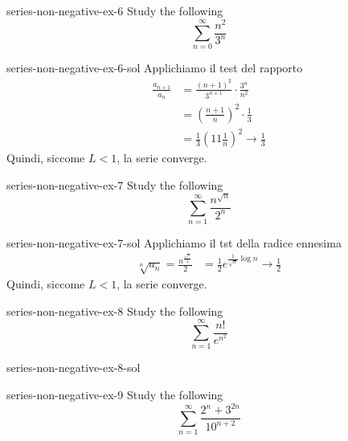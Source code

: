 \documentclass[preview]{standalone}
\begin{document}
\begin{snippetexercise}{series-non-negative-ex-6}{}
    Study the following \series
    \[
        \sum_{n=0}^\infty \frac{n^2}{3^n}
    \]
\end{snippetexercise}

\begin{snippetsolution}{series-non-negative-ex-6-sol}{}
    Applichiamo il test del rapporto
    \begin{align*}
        \frac{a_{n+1}}{a_n} &= \frac{{(n+1)}^2}{3^{n+1}}
        \cdot \frac{3^n}{n^2} \\
        &= {\left(\frac{n+1}{n}\right)}^2 \cdot \frac{1}{3}
        \\
        &= \frac{1}{3} {\left(1 1 \frac{1}{n}\right)}^2 \to \frac{1}{3}
    \end{align*}
    Quindi, siccome \(L < 1\), la serie converge.
\end{snippetsolution}

\begin{snippetexercise}{series-non-negative-ex-7}{}
    Study the following \series
    \[
        \sum_{n=1}^\infty \frac{n^{\sqrt{n}}}{2^n}
    \]
\end{snippetexercise}

\begin{snippetsolution}{series-non-negative-ex-7-sol}{}
    Applichiamo il tst della radice ennesima
    \begin{align*}
        \sqrt[n]{a_n} = \frac{
            n^{\frac{\sqrt{n}}{2}}
        }{2}
        &= \frac{1}{2} e^{\frac{1}{\sqrt{n}}\log n} \to \frac{1}{2}
    \end{align*}
    Quindi, siccome \(L < 1\), la serie converge.
\end{snippetsolution}

\begin{snippetexercise}{series-non-negative-ex-8}{}
    Study the following \series
    \[
        \sum_{n=1}^\infty \frac{
            n!
        }{
            e^{n^2}
        }
    \]
\end{snippetexercise}

\begin{snippetsolution}{series-non-negative-ex-8-sol}{}
    \todo
\end{snippetsolution}

\begin{snippetexercise}{series-non-negative-ex-9}{}
    Study the following \series
    \[
        \sum_{n=1}^\infty \frac{
            2^n + 3^{2n}
        }{
            10^{n+2}
        }
    \]
\end{snippetexercise}
\end{document}
